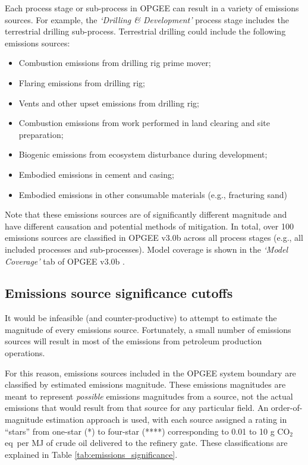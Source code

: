 \documentclass[11pt]{report}
\newcommand{\version}{v3.0b }
\newcommand{\sheet}[1]{\textit{`{#1}'}}
\begin{document}
Each process stage or sub-process in OPGEE can result in a variety of emissions sources. For example, the \sheet{Drilling \& Development} process stage includes the terrestrial drilling sub-process. Terrestrial drilling could include the following emissions sources:
\begin{itemize}
\item Combustion emissions from drilling rig prime mover;
\item Flaring emissions from drilling rig;
\item Vents and other upset emissions from drilling rig;
\item Combustion emissions from work performed in land clearing and site preparation;
\item Biogenic emissions from ecosystem disturbance during development;
\item Embodied emissions in cement and casing;
\item Embodied emissions in other consumable materials (e.g., fracturing sand)
\end{itemize}
Note that these emissions sources are of significantly different magnitude and have different causation and potential methods of mitigation. In total, over 100 emissions sources are classified in OPGEE \version across all process stages (e.g., all included processes and sub-processes). Model coverage is shown in the \sheet{Model Coverage} tab of OPGEE \version.



\subsection{Emissions source significance cutoffs}

It would be infeasible (and counter-productive) to attempt to estimate the magnitude of every emissions source. Fortunately, a small number of emissions sources will result in most of the emissions from petroleum production operations. 

For this reason, emissions sources included in the OPGEE system boundary are classified by estimated emissions magnitude. These emissions magnitudes are meant to represent \emph{possible} emissions magnitudes from a source, not the actual emissions that would result from that source for any particular field. An order-of-magnitude estimation approach is used, with each source assigned a rating in ``stars'' from one-star (*) to four-star (****) corresponding to 0.01 to 10 g CO$_2$ eq\ per MJ of crude oil delivered to the refinery gate. These classifications are explained in Table \ref{tab:emissions_significance}.
\end{document}
